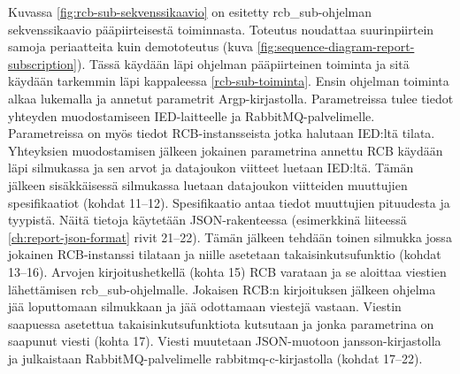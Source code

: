 Kuvassa \ref{fig:rcb-sub-sekvenssikaavio} on esitetty rcb\_sub-ohjelman sekvenssikaavio pääpiirteisestä toiminnasta. Toteutus noudattaa suurinpiirtein samoja periaatteita kuin demototeutus (kuva \ref{fig:sequence-diagram-report-subscription}). Tässä käydään läpi ohjelman pääpiirteinen toiminta ja sitä käydään tarkemmin läpi kappaleessa \ref{rcb-sub-toiminta}. Ensin ohjelman toiminta alkaa lukemalla ja annetut parametrit Argp-kirjastolla. Parametreissa tulee tiedot yhteyden muodostamiseen IED-laitteelle ja RabbitMQ-palvelimelle. Parametreissa on myös tiedot RCB-instansseista jotka halutaan IED:ltä tilata. Yhteyksien muodostamisen jälkeen jokainen parametrina annettu RCB käydään läpi silmukassa ja sen arvot ja datajoukon viitteet luetaan IED:ltä. Tämän jälkeen sisäkkäisessä silmukassa luetaan datajoukon viitteiden muuttujien spesifikaatiot (kohdat 11--12). Spesifikaatio antaa tiedot muuttujien pituudesta ja tyypistä. Näitä tietoja käytetään JSON-rakenteessa (esimerkkinä liiteessä \ref{ch:report-json-format} rivit 21--22). Tämän jälkeen tehdään toinen silmukka jossa jokainen RCB-instanssi tilataan ja niille asetetaan takaisinkutsufunktio (kohdat 13--16). Arvojen kirjoitushetkellä (kohta 15) RCB varataan ja se aloittaa viestien lähettämisen rcb\_sub-ohjelmalle. Jokaisen RCB:n kirjoituksen jälkeen ohjelma jää loputtomaan silmukkaan ja jää odottamaan viestejä vastaan. Viestin saapuessa asetettua takaisinkutsufunktiota kutsutaan ja jonka parametrina on saapunut viesti (kohta 17). Viesti muutetaan JSON-muotoon jansson-kirjastolla ja julkaistaan RabbitMQ-palvelimelle rabbitmq-c-kirjastolla (kohdat 17--22).

